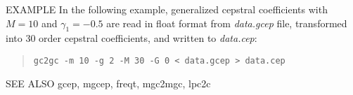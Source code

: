 \begin{qsection}{EXAMPLE}
In the following example, generalized cepstral coefficients
with $M=10$ and $\gamma_1=-0.5$ are read in float format from
{\em data.gcep} file, transformed into 30 order cepstral coefficients,
and written to {\em data.cep}:
\begin{quote}
 \verb!gc2gc -m 10 -g 2 -M 30 -G 0 < data.gcep > data.cep!
\end{quote} 
\end{qsection}

\begin{qsection}{SEE ALSO}
gcep, mgcep, freqt, mgc2mgc, lpc2c
\end{qsection}
